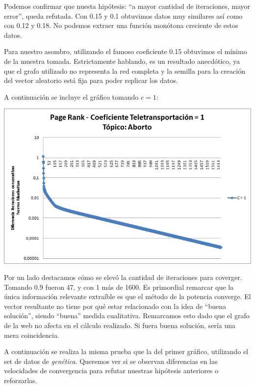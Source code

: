 	Podemos confirmar que nuesta hipótesis: ``a mayor cantidad de iteraciones, mayor error'', queda refutada. Con 0.15 y 0.1 obtuvimos datos muy similares así como con 0.12 y 0.18. No podemos extraer una función monótona creciente de estos datos. 

	Para nuestro asombro, utilizando el famoso coeficiente 0.15 obtuvimos el mínimo de la muestra tomada. Estrictamente hablando, es un resultado anecdótico, ya que el grafo utilizado no representa la red completa y la semilla para la creación del vector aleatorio está fija para poder replicar los datos.

	A continuación se incluye el gráfico tomando $c = 1$:

	\par 
	\begin{center}
		\includegraphics[scale=0.6]{./img/page_rank_variacion_coef_teletransportacion_1.png}
	\end{center}
	\par 

	Por un lado destacamos cómo se elevó la cantidad de iteraciones para coverger. Tomando 0.9 fueron 47, y con 1 más de 1600. Es primordial remarcar que la única información relevante extraíble es que el método de la potencia converge. El vector resultante no tiene por qué estar relacionado con la idea de ``buena solución'', siendo ``buena'' medida cualitativa. Remarcamos esto dado que el grafo de la web no afecta en el cálculo realizado. Si fuera buena solución, sería una mera coincidencia.

	A continuación se realiza la misma prueba que la del primer gráfico, utilizando el set de datos de \textit{genética}. Queremos ver si se observan diferencias en las velocidades de convergencia para refutar nuestras hipótesis anteriores o reforzarlas.

